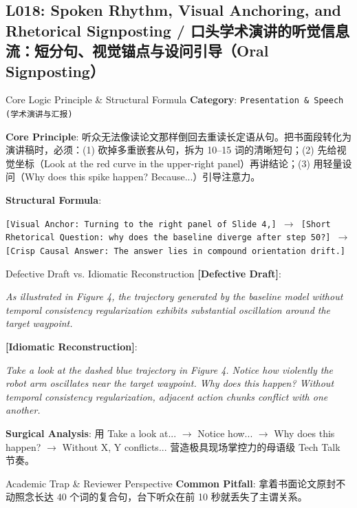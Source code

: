 \subsection{L018: Spoken Rhythm, Visual Anchoring, and Rhetorical Signposting / 口头学术演讲的听觉信息流：短分句、视觉锚点与设问引导（Oral Signposting）}\label{sec:logic:L018}
\begin{ConceptBox}{Core Logic Principle \& Structural Formula}
\textbf{Category}: \texttt{Presentation \& Speech (学术演讲与汇报)}\par\vspace{3pt}
\textbf{Core Principle}: 听众无法像读论文那样倒回去重读长定语从句。把书面段转化为演讲稿时，必须：(1)  砍掉多重嵌套从句，拆为 10--15 词的清晰短句；(2)  先给视觉坐标（Look at the red curve in the upper-right panel）再讲结论；(3)  用轻量设问（Why does this spike happen? Because...）引导注意力。\par\vspace{4pt}
\textbf{Structural Formula}:\par\noindent\texttt{[Visual Anchor: Turning to the right panel of Slide 4,] $\to$ [Short Rhetorical Question: why does the baseline diverge after step 50?] $\to$ [Crisp Causal Answer: The answer lies in compound orientation drift.]}
\end{ConceptBox}
\begin{ExampleBox}{Defective Draft vs. Idiomatic Reconstruction}
\textbf{\color{TargetHighlight}[Defective Draft]}:\par\textit{As illustrated in Figure 4, the trajectory generated by the baseline model without temporal consistency regularization exhibits substantial oscillation around the target waypoint.}\par\vspace{4pt}
\textbf{\color{AcadNavy}[Idiomatic Reconstruction]}:\par\textit{Take a look at the dashed blue trajectory in Figure 4. Notice how violently the robot arm oscillates near the target waypoint. Why does this happen? Without temporal consistency regularization, adjacent action chunks conflict with one another.}\par\vspace{4pt}
\textbf{Surgical Analysis}: 用 Take a look at... $\to$ Notice how... $\to$ Why does this happen? $\to$ Without X, Y conflicts... 营造极具现场掌控力的母语级 Tech Talk 节奏。
\end{ExampleBox}
\begin{TipBox}{Academic Trap \& Reviewer Perspective}
\textbf{Common Pitfall}: 拿着书面论文原封不动照念长达 40 个词的复合句，台下听众在前 10 秒就丢失了主谓关系。
\end{TipBox}
\vspace{6pt}

